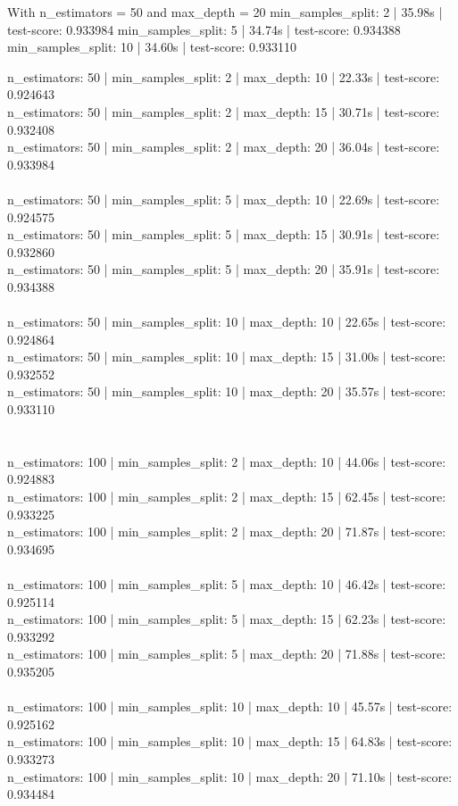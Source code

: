 \documentclass[12pt, letterpaper]{article}
\begin{document}
With n_estimators = 50 and max_depth = 20
min_samples_split: 2 | 35.98s | test-score: 0.933984
min_samples_split: 5 | 34.74s | test-score: 0.934388
min_samples_split: 10 | 34.60s | test-score: 0.933110


n_estimators: 50 | min_samples_split: 2 | max_depth: 10 | 22.33s | test-score: 0.924643 \\
n_estimators: 50 | min_samples_split: 2 | max_depth: 15 | 30.71s | test-score: 0.932408 \\
n_estimators: 50 | min_samples_split: 2 | max_depth: 20 | 36.04s | test-score: 0.933984 \\ \\
n_estimators: 50 | min_samples_split: 5 | max_depth: 10 | 22.69s | test-score: 0.924575 \\
n_estimators: 50 | min_samples_split: 5 | max_depth: 15 | 30.91s | test-score: 0.932860 \\
n_estimators: 50 | min_samples_split: 5 | max_depth: 20 | 35.91s | test-score: 0.934388 \\ \\
n_estimators: 50 | min_samples_split: 10 | max_depth: 10 | 22.65s | test-score: 0.924864 \\
n_estimators: 50 | min_samples_split: 10 | max_depth: 15 | 31.00s | test-score: 0.932552 \\
n_estimators: 50 | min_samples_split: 10 | max_depth: 20 | 35.57s | test-score: 0.933110 \\ \\ \\

n_estimators: 100 | min_samples_split: 2 | max_depth: 10 | 44.06s | test-score: 0.924883 \\
n_estimators: 100 | min_samples_split: 2 | max_depth: 15 | 62.45s | test-score: 0.933225 \\
n_estimators: 100 | min_samples_split: 2 | max_depth: 20 | 71.87s | test-score: 0.934695 \\ \\
n_estimators: 100 | min_samples_split: 5 | max_depth: 10 | 46.42s | test-score: 0.925114 \\
n_estimators: 100 | min_samples_split: 5 | max_depth: 15 | 62.23s | test-score: 0.933292 \\
n_estimators: 100 | min_samples_split: 5 | max_depth: 20 | 71.88s | test-score: 0.935205 \\ \\
n_estimators: 100 | min_samples_split: 10 | max_depth: 10 | 45.57s | test-score: 0.925162 \\
n_estimators: 100 | min_samples_split: 10 | max_depth: 15 | 64.83s | test-score: 0.933273 \\
n_estimators: 100 | min_samples_split: 10 | max_depth: 20 | 71.10s | test-score: 0.934484 \\ \\ \\
\end{document}
